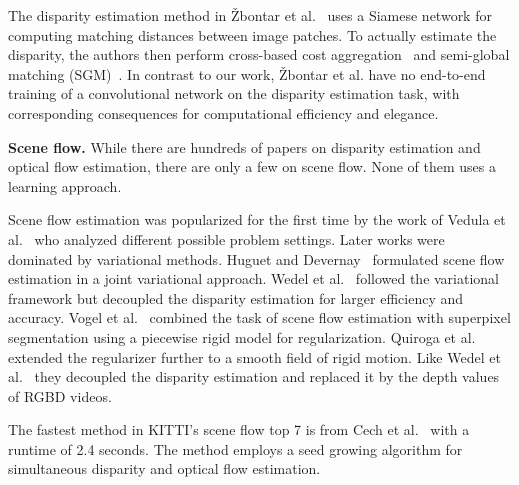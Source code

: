 \documentclass[10pt,twocolumn,letterpaper]{article}
\begin{document}
The disparity estimation method in {\v{Z}}bontar et al.~\cite{zbontar2015stereo} uses a Siamese network for computing matching distances between image patches. To actually estimate the disparity, the authors then perform cross-based cost aggregation~\cite{ZhangLL09} and semi-global matching (SGM)~\cite{Hirschmueller2008PAMI}. In contrast to our work, {\v{Z}}bontar et al. have no end-to-end training of a convolutional network on the disparity estimation task, with corresponding consequences for computational efficiency and elegance. 


\textbf{Scene flow.}
While there are hundreds of papers on disparity estimation and optical flow estimation, there are only a few on scene flow. None of them uses a learning approach. 

Scene flow estimation was popularized for the first time by the work of Vedula et al.~\cite{VBRCK05} who analyzed different possible problem settings. Later works were dominated by variational methods. Huguet and Devernay~\cite{HD07} formulated scene flow estimation in a joint variational approach. Wedel et al.~\cite{wedel2008efficient} followed the variational framework but decoupled the disparity estimation for larger efficiency and accuracy. Vogel et al.~\cite{Vogel2013ICCV} combined the task of scene flow estimation with superpixel segmentation using a piecewise rigid model for regularization.
Quiroga et al.~\cite{quiroga2012scene} extended the regularizer further to a smooth field of rigid motion. Like Wedel et al.~\cite{wedel2008efficient} they decoupled the disparity estimation and replaced it by the depth values of RGBD videos. 

The fastest method in KITTI's scene flow top 7 is from Cech et al.~\cite{Cech11} with a runtime of 2.4 seconds. 
The method employs a seed growing algorithm for simultaneous disparity and optical flow estimation.
\end{document}
